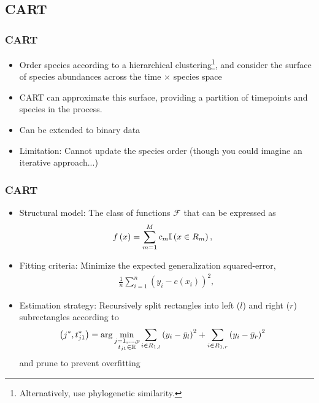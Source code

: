 \documentclass{beamer}
\begin{document}
\subsection{CART}
\label{subsec:CART}

\begin{frame}
  \frametitle{CART}
  \begin{itemize}
  \item Order species according to a hierarchical
    clustering\footnote{Alternatively, use phylogenetic similarity.}, and
    consider the surface of species abundances across the time $\times$ species space
  \item CART can approximate this surface, providing a partition of timepoints
    and species in the process.
  \item Can be extended to binary data
  \item Limitation: Cannot update the species order (though you could imagine an
    iterative approach...)
  \end{itemize}
\end{frame}

\begin{frame}
  \frametitle{CART}
\begin{itemize}
\item Structural model: The class of functions $\mathcal{F}$ that can be
  expressed as
\begin{align*}
  f\left(x\right) &= \sum_{m = 1}^{M} c_{m} \mathbb{I}\left({x \in R_{m}}\right),
\end{align*}
\item Fitting criteria: Minimize the expected generalization squared-error,
\begin{align*}
  \frac{1}{n} \sum_{i = 1}^{n} \left(y_{i} - c\left(x_{i}\right)\right)^{2},
\end{align*}
\item Estimation strategy: Recursively split rectangles into left ($l$) and
  right ($r$) subrectangles according to
\begin{align*}
  \left(j^{\ast}, t_{j1}^{\ast}\right) &= \arg \min_{\substack{j = 1, \dots, p \\ t_{j1} \in \mathbb{R}}} \sum_{i \in R_{1, l}} \left(y_{i} - \bar{y}_{l}\right)^{2} + \sum_{i \in R_{1, r}} \left(y_{i} - \bar{y}_{r}\right)^{2}
\end{align*}
and prune to prevent overfitting
\end{itemize}
\end{frame}
\end{document}
